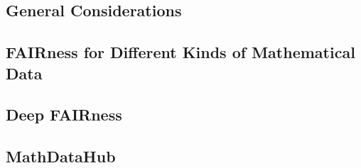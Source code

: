 

\subsection{General Considerations}
 

\subsection{FAIRness for Different Kinds of Mathematical Data}
 

\subsection{Deep FAIRness}\label{sec:deep}
 

\subsection{MathDataHub}\label{sec:hub}
 

